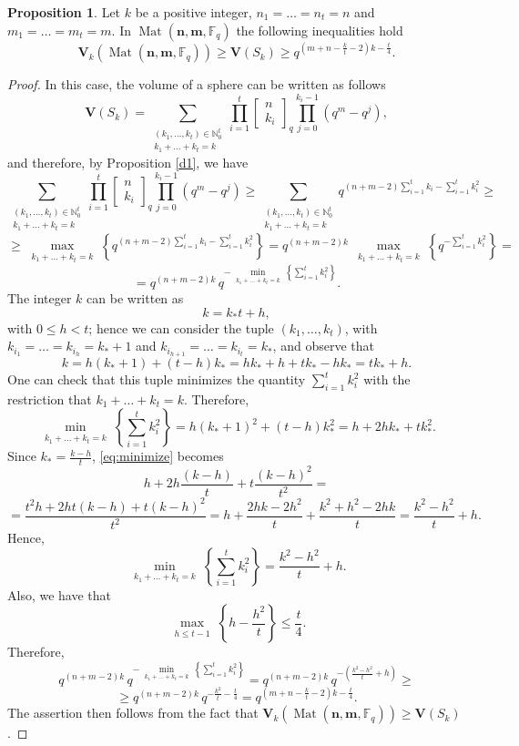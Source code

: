 \documentclass[11pt]{amsart}
\newcommand{\qqbin}[2]{\begin{bmatrix}
		{#1} \\ {#2 }
\end{bmatrix}_q}
\DeclareMathOperator{\Mat}{Mat}
\theoremstyle{definition}
\newtheorem{proposition}[theorem]{Proposition}
\newcommand{\F}{{\mathbb F}}
\newcommand{\bfn}{\mathbf {n}}
\newcommand{\bfm}{\mathbf {m}}
\newcommand{\spacmn}{\Mat(\bfn,\bfm,\F_q)}
\begin{document}
\begin{proposition} \label{d9}
Let $ k $ be a positive integer,  $ n_1 = \ldots = n_t = n $ and $ m_1 = \ldots = m_t = m $. In $\spacmn$ the following inequalities hold
\[
\mathbf{V}_k(\spacmn) \geq \mathbf{V}(S_k) \geq q^{(m + n - \frac{k}{t} - 2)k - \frac{t}{4}}.
\]
\end{proposition}
\begin{proof}
	In this case, the volume of a sphere can be written as follows 
    $$\mathbf{V}(S_k)=\sum_{\substack{(k_1,\ldots,k_t) \in \mathbb{N}_0^t \\ k_1+\ldots+k_t=k}} \prod_{i=1}^{t}\qqbin{n}{k_i} \prod_{j=0}^{k_i-1}(q^{m}-q^j),$$ 
    and therefore, by Proposition \ref{d1}, we have 
    $$ \sum_{\substack{(k_1,\ldots,k_t) \in \mathbb{N}_0^t \\ k_1+\ldots+k_t=k}} \prod_{i=1}^{t}\qqbin{n}{k_i} \prod_{j=0}^{k_i-1}(q^{m}-q^j) \geq \sum_{\substack{(k_1,\ldots,k_t) \in \mathbb{N}_0^t \\ k_1+\ldots+k_t=k}} q^{(n+m-2)\sum_{i=1}^{t}k_i-\sum_{i=1}^{t}k_i^2} \geq $$ $$ \geq  \max_{\substack{k_1+\ldots +k_t=k}} \left\{ q^{(n+m-2)\sum_{i=1}^{t}k_i-\sum_{i=1}^{t}k_i^2} \right\}=q^{(n+m-2)k} \, \max_{\substack{k_1+\ldots +k_t=k}} \left\{q^{-\sum_{i=1}^{t}k_i^2}\right\}=$$ $$= q^{(n+m-2)k} \, q^{-\min_{\substack{k_1+\ldots +k_t=k}} \left\{\sum_{i=1}^{t} k_i^2 \right\}}. $$ 
    The integer $k$ can be written as $$k=k_* t + h,$$ with $ 0 \leq h < t$; hence we can consider the tuple $(k_1,\ldots,k_t)$, with $k_{i_1}=\ldots=k_{i_h}= k_*+1$ and $k_{i_{h+1}}=\ldots=k_{i_t}=k_*$, and observe that $$k= h(k_*+1)+(t-h)k_*=hk_*+h+tk_*-hk_*=tk_*+h.$$ 
    One can check that this tuple minimizes the quantity $\sum_{i=1}^{t}k_i^2$ with the restriction that $k_1+\ldots +k_t=k$. 
    Therefore,
    \begin{equation}\label{eq:minimize}
    \min_{\substack{k_1+\ldots +k_t=k}} \left\{\sum_{i=1}^{t} k_i^2 \right\} = h (k_*+1)^2+(t-h)k_*^2=h+2hk_*+tk_*^2. 
    \end{equation}
    Since $k_*= \frac{k-h}{t}$, \eqref{eq:minimize} becomes 
    $$h + 2h \frac{(k-h)}{t} + t \frac{(k-h)^2}{t^2}=$$ $$= \frac{t^2h+2ht(k-h)+t(k-h)^2}{t^2}= h+ \frac{2hk-2h^2}{t}+ \frac{k^2+h^2-2hk}{t} = \frac{k^2-h^2}{t} +h .$$ Hence, 
    $$ \min_{\substack{k_1+\ldots +k_t=k}} \left\{\sum_{i=1}^{t} k_i^2 \right\} = \frac{k^2-h^2}{t} +h .$$
    Also, we have that 
    $$\max_{\substack{h \leq t-1}} \left\{h-\frac{h^2}{t} \right\} \leq \frac{t}{4}.$$ 
	Therefore, 
    $$q^{(n+m-2)k} \, q^{-\min_{\substack{k_1+\ldots +k_t=k}} \left\{\sum_{i=1}^{t} k_i^2 \right\}}= q^{(n+m-2)k} \, q^{-\left(\frac{k^2-h^2}{t}+h \right)} \geq$$ $$ \geq q^{(n+m-2)k} \, q^{-\frac{k^2}{t}-\frac{t}{4}}= q^{(m+n-\frac{k}{t}-2)k-\frac{t}{4}}. $$ The assertion then follows from the fact that $\mathbf{V}_k(\spacmn) \geq \mathbf{V}(S_k) $. 

\end{proof}
\end{document}
